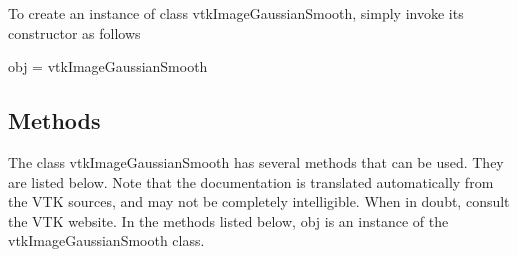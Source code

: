 To create an instance of class vtk\-Image\-Gaussian\-Smooth, simply invoke its constructor as follows \begin{DoxyVerb}  obj = vtkImageGaussianSmooth
\end{DoxyVerb}
 \hypertarget{vtkwidgets_vtkxyplotwidget_Methods}{}\subsection{Methods}\label{vtkwidgets_vtkxyplotwidget_Methods}
The class vtk\-Image\-Gaussian\-Smooth has several methods that can be used. They are listed below. Note that the documentation is translated automatically from the V\-T\-K sources, and may not be completely intelligible. When in doubt, consult the V\-T\-K website. In the methods listed below, {\ttfamily obj} is an instance of the vtk\-Image\-Gaussian\-Smooth class. 
